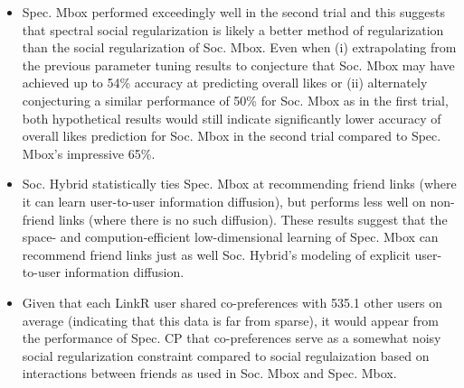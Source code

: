 \begin{itemize}
\item Spec. Mbox performed exceedingly well in the second trial 
and this suggests that spectral social regularization is likely a
better method of regularization than the social
regularization of Soc. Mbox.  Even when
(i) extrapolating from the previous parameter tuning results to
conjecture that Soc. Mbox may have achieved up to 54\% accuracy at
predicting overall likes or (ii) alternately conjecturing a similar
performance of 50\% for Soc. Mbox as in the first trial, both
hypothetical results would still indicate significantly lower accuracy
of overall likes prediction for Soc. Mbox in the second trial compared to
Spec. Mbox's impressive 65\%.

\item Soc. Hybrid statistically ties Spec. Mbox at 
recommending friend links (where it can learn user-to-user information
diffusion), but performs less well on non-friend links (where there is
no such diffusion).
%
These results suggest that the space- and
compution-efficient low-dimensional learning of Spec. Mbox can
recommend friend links just as well Soc. Hybrid's modeling of explicit
user-to-user information diffusion.

\item Given that
each LinkR user shared co-preferences with 535.1 other users on
average (indicating that this data is far from sparse), it would
appear from the performance of Spec. CP that
co-preferences serve as a somewhat noisy social regularization
constraint compared to social regulaization based on interactions between
friends as used in Soc. Mbox and Spec. Mbox.

\end{itemize}


